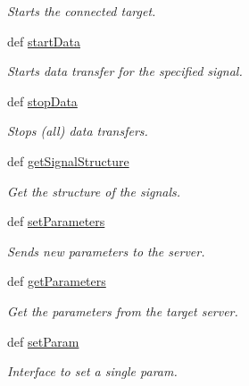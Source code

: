 \begin{DoxyCompactItemize}
\begin{DoxyCompactList}\small\item\em \-Starts the connected target. \end{DoxyCompactList}\item 
def \hyperlink{classpyrtai_1_1target_1_1_target_aadaa0ae2a3535637dde24e5a822e50e7}{start\-Data}
\begin{DoxyCompactList}\small\item\em \-Starts data transfer for the specified signal. \end{DoxyCompactList}\item 
def \hyperlink{classpyrtai_1_1target_1_1_target_a3419fad652e47f0e1b6adbd7c2f3c76c}{stop\-Data}
\begin{DoxyCompactList}\small\item\em \-Stops (all) data transfers. \end{DoxyCompactList}\item 
def \hyperlink{classpyrtai_1_1target_1_1_target_ac60d73c462fc3988624a36301e7f885f}{get\-Signal\-Structure}
\begin{DoxyCompactList}\small\item\em \-Get the structure of the signals. \end{DoxyCompactList}\item 
def \hyperlink{classpyrtai_1_1target_1_1_target_a2a8d46776e9b4c03081bb4426d849517}{set\-Parameters}
\begin{DoxyCompactList}\small\item\em \-Sends new parameters to the server. \end{DoxyCompactList}\item 
def \hyperlink{classpyrtai_1_1target_1_1_target_a5f5a51ab29bf80e6ff26074e15af49f2}{get\-Parameters}
\begin{DoxyCompactList}\small\item\em \-Get the parameters from the target server. \end{DoxyCompactList}\item 
def \hyperlink{classpyrtai_1_1target_1_1_target_a9d6334d4c1ada8dae518f56ccf8fddab}{set\-Param}
\begin{DoxyCompactList}\small\item\em \-Interface to set a single param. \end{DoxyCompactList}\end{DoxyCompactItemize}
